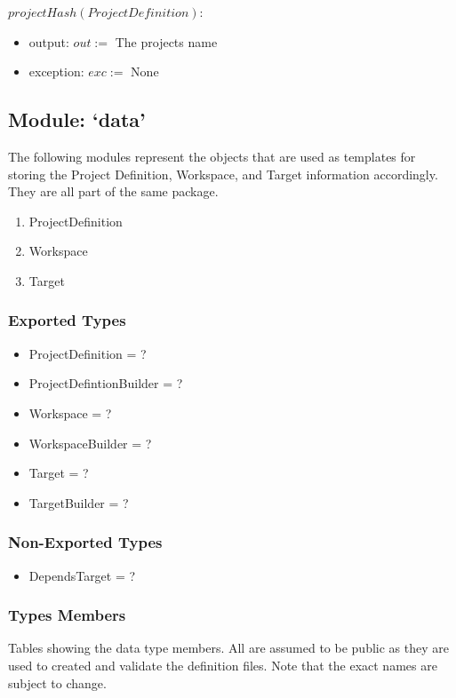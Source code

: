 \documentclass[11pt]{article}
\begin{document}
$projectHash(ProjectDefinition):$
\begin{itemize}
\item output: $out :=$ The projects name
\item exception: $exc :=$ None
\end{itemize}

\subsection{Module: `data'}
\label{mod:data}
The following modules represent the objects that are used as templates for storing the Project Definition, Workspace, and Target information accordingly. They are all part of the same package.

\begin{enumerate}
\item ProjectDefinition
\item Workspace
\item Target
\end{enumerate}

\subsubsection{Exported Types}
\begin{itemize}
\item ProjectDefinition = ?
\item ProjectDefintionBuilder = ?
\item Workspace = ?
\item WorkspaceBuilder = ?
\item Target = ?
\item TargetBuilder = ?
\end{itemize}

\subsubsection{Non-Exported Types}
\begin{itemize}
\item DependsTarget = ?
\end{itemize}

\newpage
\subsubsection{Types Members}

Tables showing the data type members. All are assumed to be public as they are
used to created and validate the definition files. Note that the exact names are
subject to change.
\end{document}
